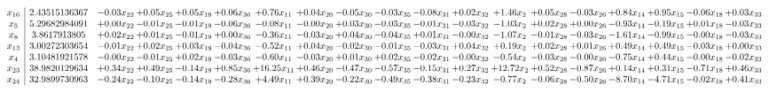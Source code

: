 \documentclass[9pt]{article}
\begin{document}
 \[\begin{array}{c| c c@{\hskip 2pt} c@{\hskip 2pt} c@{\hskip 2pt} c@{\hskip 2pt} c@{\hskip 2pt} c@{\hskip 2pt} c@{\hskip 2pt} c@{\hskip 2pt} c@{\hskip 2pt} c@{\hskip 2pt} c@{\hskip 2pt} c@{\hskip 2pt} c@{\hskip 2pt} c@{\hskip 2pt} c@{\hskip 2pt} c@{\hskip 2pt} c@{\hskip 2pt} }
 x_{16}   &  2.43515136367 & -0.03 x_{22} & +  0.05 x_{25} & +  0.05 x_{19} & +  0.06 x_{36} & +  0.76 x_{11} & +  0.04 x_{20} & -0.05 x_{30} & -0.03 x_{35} & -0.08 x_{31} & +  0.02 x_{32} & +  1.46 x_{2} & +  0.05 x_{28} & -0.03 x_{26} & +  0.84 x_{14} & +  0.95 x_{15} & -0.06 x_{18} & +  0.03 x_{33}\\
 x_{5}   &  5.29682984091 & +  0.00 x_{22} & -0.01 x_{25} & -0.01 x_{19} & -0.06 x_{36} & -0.08 x_{11} & -0.00 x_{20} & +  0.03 x_{30} & -0.03 x_{35} & -0.01 x_{31} & -0.03 x_{32} & -1.03 x_{2} & +  0.02 x_{28} & +  0.00 x_{26} & -0.93 x_{14} & -0.19 x_{15} & +  0.01 x_{18} & -0.03 x_{33}\\
 x_{8}   &  3.8617913805 & +  0.02 x_{22} & +  0.01 x_{25} & -0.01 x_{19} & +  0.00 x_{36} & -0.36 x_{11} & -0.03 x_{20} & +  0.04 x_{30} & -0.04 x_{35} & +  0.01 x_{31} & -0.00 x_{32} & -1.07 x_{2} & -0.01 x_{28} & -0.03 x_{26} & -1.61 x_{14} & -0.99 x_{15} & -0.00 x_{18} & -0.03 x_{33}\\
 x_{13}   &  3.00272303654 & -0.01 x_{22} & +  0.02 x_{25} & +  0.03 x_{19} & -0.04 x_{36} & -0.52 x_{11} & +  0.04 x_{20} & -0.02 x_{30} & -0.01 x_{35} & -0.03 x_{31} & +  0.04 x_{32} & +  0.19 x_{2} & +  0.02 x_{28} & +  0.01 x_{26} & +  0.49 x_{14} & +  0.49 x_{15} & -0.03 x_{18} & +  0.00 x_{33}\\
 x_{4}   &  3.10481921578 & -0.00 x_{22} & -0.01 x_{25} & +  0.02 x_{19} & -0.03 x_{36} & -0.60 x_{11} & -0.03 x_{20} & +  0.01 x_{30} & +  0.02 x_{35} & -0.02 x_{31} & -0.00 x_{32} & -0.54 x_{2} & -0.03 x_{28} & -0.00 x_{26} & -0.75 x_{14} & +  0.44 x_{15} & -0.00 x_{18} & -0.02 x_{33}\\
 x_{23}   &  38.9820129634 & +  0.34 x_{22} & +  0.49 x_{25} & -0.14 x_{19} & +  0.85 x_{36} & + 16.25 x_{11} & +  0.46 x_{20} & -0.47 x_{30} & -0.57 x_{35} & -0.15 x_{31} & +  0.27 x_{32} & + 12.72 x_{2} & +  0.52 x_{28} & -0.87 x_{26} & +  0.14 x_{14} & +  0.31 x_{15} & -0.71 x_{18} & +  0.46 x_{33}\\
 x_{24}   &  32.9899730963 & -0.24 x_{22} & -0.10 x_{25} & -0.14 x_{19} & -0.28 x_{36} & +  4.49 x_{11} & +  0.39 x_{20} & -0.22 x_{30} & -0.49 x_{35} & -0.38 x_{31} & -0.23 x_{32} & -0.77 x_{2} & -0.06 x_{28} & -0.50 x_{26} & -8.70 x_{14} & -4.71 x_{15} & -0.02 x_{18} & +  0.41 x_{33}\\

\end{array}\]
\end{document}
